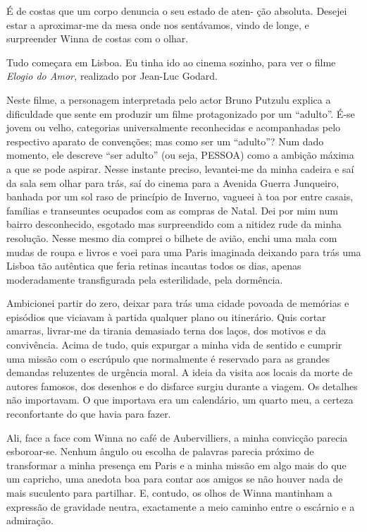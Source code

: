 É de costas que um corpo denuncia o seu estado de aten- ção absoluta.
Desejei estar a aproximar-me da mesa onde nos sentávamos, vindo de
longe, e surpreender Winna de costas com o olhar.

Tudo começara em Lisboa. Eu tinha ido ao cinema sozinho, para ver o
filme \emph{Elogio do Amor, }realizado por Jean-Luc Godard.

Neste filme, a personagem interpretada pelo actor Bruno Putzulu explica
a dificuldade que sente em produzir um filme protagonizado por um
``adulto''. É-se jovem ou velho, categorias universalmente
reconhecidas e acompanhadas pelo respectivo aparato de convenções; mas
como ser um ``adulto''? Num dado momento, ele descreve ``ser adulto''
(ou seja, PESSOA) como a ambição máxima a que se pode aspirar. Nesse
instante preciso, levantei-me da minha cadeira e saí da sala sem olhar
para trás, saí do cinema para a Avenida Guerra Junqueiro, banhada por
um sol raso de princípio de Inverno, vagueei à toa por entre casais,
famílias e transeuntes ocupados com as compras de Natal. Dei por mim num
bairro desconhecido, esgotado mas surpreendido com a nitidez rude da
minha resolução. Nesse mesmo dia comprei o bilhete de avião, enchi uma
mala com mudas de roupa e livros e voei para uma Paris imaginada
deixando para trás uma Lisboa tão autêntica que feria retinas incautas
todos os dias, apenas moderadamente transfigurada pela esterilidade,
pela dormência.

Ambicionei partir do zero, deixar para trás uma cidade povoada de
memórias e episódios que viciavam à partida qualquer plano ou
itinerário. Quis cortar amarras, livrar-me da tirania demasiado terna
dos laços, dos motivos e da convivência. Acima de tudo, quis expurgar
a minha vida de sentido e cumprir uma missão com o escrúpulo que
normalmente é reservado para as grandes demandas reluzentes de urgência
moral. A ideia da visita aos locais da morte de autores famosos, dos
desenhos e do disfarce surgiu durante a viagem. Os detalhes não
importavam. O que importava era um calendário, um quarto meu, a
certeza reconfortante do que havia para fazer.

Ali, face a face com Winna no café de Aubervilliers, a
minha convicção parecia esboroar-se. Nenhum ângulo ou escolha de
palavras parecia próximo de transformar a minha presença em Paris e a
minha missão em algo mais do que um capricho, uma anedota boa para
contar aos amigos se não houver nada de mais suculento para partilhar.
E, contudo, os olhos de Winna mantinham a expressão de gravidade neutra,
exactamente a meio caminho entre o escárnio e a admiração.

